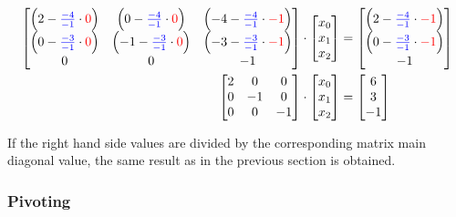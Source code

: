\documentclass[]{scrartcl}
\begin{document}
\begin{align*}
\begin{bmatrix}
\left(2 - \textcolor{blue}{\frac{-4}{-1}} \cdot \textcolor{red}{0} \right)&
\left(0 - \textcolor{blue}{\frac{-4}{-1}} \cdot \textcolor{red}{0} \right)&
\left(-4 - \textcolor{blue}{\frac{-4}{-1}} \cdot \textcolor{red}{-1} \right)\\
\left(0 - \textcolor{blue}{\frac{-3}{-1}} \cdot \textcolor{red}{0} \right)&
\left(-1 - \textcolor{blue}{\frac{-3}{-1}} \cdot \textcolor{red}{0} \right)&
\left(-3 - \textcolor{blue}{\frac{-3}{-1}} \cdot \textcolor{red}{-1} \right)\\
0&
0&
-1\\
\end{bmatrix}
&\cdot
\begin{bmatrix}
x_0\\
x_1\\
x_2\\
\end{bmatrix}
=
\begin{bmatrix}
\left(2 - \textcolor{blue}{\frac{-4}{-1}} \cdot \textcolor{red}{-1} \right)\\
\left(0 - \textcolor{blue}{\frac{-3}{-1}} \cdot \textcolor{red}{-1} \right)\\
-1\\
\end{bmatrix}
\\
\begin{bmatrix}
2&0&0\\
0&-1&0\\
0&0&-1\\
\end{bmatrix}
&\cdot
\begin{bmatrix}
x_0\\
x_1\\
x_2\\
\end{bmatrix}
=
\begin{bmatrix}
6\\
3\\
-1\\
\end{bmatrix}
\end{align*}

If the right hand side values are divided by the corresponding matrix main diagonal value, the same result as in the previous section is obtained.


\subsubsection{Pivoting}
\end{document}
